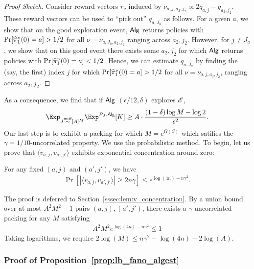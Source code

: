 \begin{proof}[Proof Sketch] Consider reward vectors $r_{\nu}$ induced by $\nu_{a,j,a_2,j_2} \propto 2q_{a,j} - q_{a_2,j_2}$. These reward vectors can be used to ``pick out'' $q_{a,J_a}$ as follows.
For a given $a$, we show that on the good exploration event, $\mathsf{Alg}$ returns policies with $\Pr[\widehat{\pi}_1^{\nu}(0) = a] > 1/2$ for all $\nu = \nu_{a,J_a,a_2,j_2}$ ranging across $a_2,j_2$. However, for $j \ne J_a$, we show that on this good event there exists some $a_2,j_2$ for which $\mathsf{Alg}$ returns policies with $\Pr[\widehat{\pi}_1^{\nu}(0)  = a] < 1/2$. Hence, we can estimate $q_{a,J_a}$ by finding the (say, the first) index $j$ for which $\Pr[\widehat{\pi}_1^{\nu}(0) = a] > 1/2$ for all $\nu = \nu_{a,j,a_2,j_2}$, ranging across $a_2,j_2$. 
\end{proof}
As a consequence, we find that if $\mathsf{Alg}$ $(\epsilon/12,\delta)$ explores $\mathscr{E}$,
\begin{align*}
\Exp_{J \unifsim [A]^M} \Exp^{\calP_J,\Alg}[K] \ge A \cdot \frac{(1 - \delta)\log M - \log 2}{\epsilon^2}.
\end{align*}
Our last step is to exhibit a packing for which $M = e^{\Omega(S)}$ which satifies the $\gamma = 1/10$-uncorrelated property. We use the probabilistic method. To begin, let us prove that $\langle v_{a,j},v_{a',j'}\rangle$ exhibits exponential concentration around zero:
\begin{lemma}\label{lem:v_concentration} For any fixed $(a,j)$ and $(a',j')$, we have
\begin{align*}
\Pr[|\langle v_{a,j} , v_{a',j'}\rangle| \ge 2n\gamma] \le e^{ \log (4n) - n\gamma^2}.
\end{align*}
\end{lemma}
The proof is deferred to Section~\ref{sssec:lem:v_concentration}. By a union bound over at most $A^2M^2 - 1$ pairs $(a,j),(a',j')$, there exists a $\gamma$-uncorrelated packing for any $M$ satisfying
\begin{align*}
A^2M^2e^{ \log (4n) - n\gamma^2} \le 1
\end{align*}
Taking logarithms, we require $2\log(M) \le n\gamma^2 - \log(4n) - 2\log(A)$.


\subsubsection{Proof of Proposition~\ref{prop:lb_fano_algest}}


